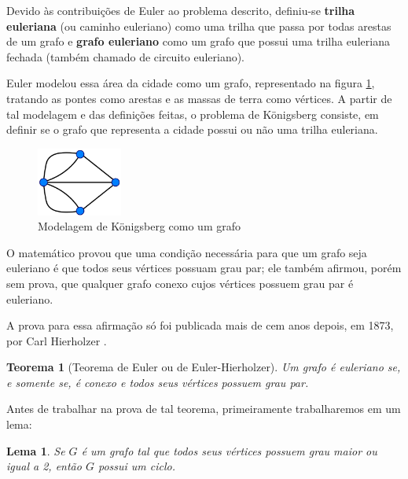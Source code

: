 \documentclass{article}
\newtheorem{theorem}{Teorema}[section]
\newtheorem{lemma}{Lema}
\begin{document}
Devido às contribuições de Euler ao problema descrito, definiu-se \textbf{trilha euleriana} (ou caminho euleriano) como uma trilha que passa por todas arestas de um grafo e \textbf{grafo euleriano} como um grafo que possui uma trilha euleriana fechada (também chamado de circuito euleriano).

Euler modelou essa área da cidade como um grafo, representado na figura \ref{konigsberg-graph}, tratando as pontes como arestas e as massas de terra como vértices.
A partir de tal modelagem e das definições feitas, o problema de Königsberg consiste, em definir se o grafo que representa a cidade possui ou não uma trilha euleriana. 


\begin{figure}
    \centering
    \includegraphics[width=0.25\textwidth]{konigsberg-graph.png}
    \caption{Modelagem de Königsberg como um grafo}
    \label{konigsberg-graph}
\end{figure}

O matemático provou que uma condição necessária para que um grafo seja euleriano é que todos seus vértices possuam grau par; 
ele também afirmou, porém sem prova, que qualquer grafo conexo cujos vértices possuem grau par é euleriano.

A prova para essa afirmação só foi publicada mais de cem anos depois, em 1873, por Carl Hierholzer \cite{hierholzer}.

\begin{theorem}[Teorema de Euler ou de Euler-Hierholzer]
    \label{euler}
    Um grafo é euleriano se, e somente se, é conexo e todos seus vértices possuem grau par.
\end{theorem}

Antes de trabalhar na prova de tal teorema, primeiramente trabalharemos em um lema:

\begin{lemma}
	Se $G$ é um grafo tal que todos seus vértices possuem grau maior ou igual a 2, então $G$ possui um ciclo.
\end{lemma}
\end{document}
